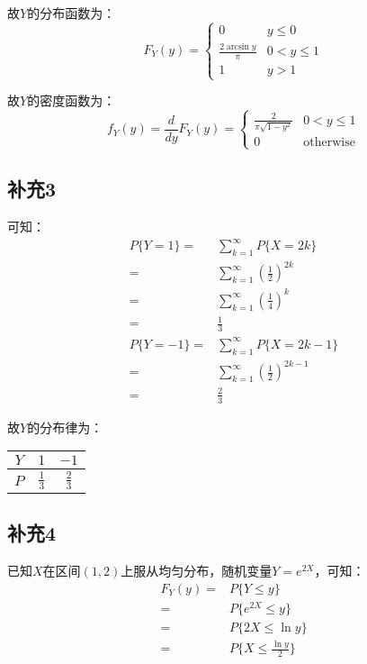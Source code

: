 \documentclass[a4paper,12pt]{ctexart}
\begin{document}
故$Y$的分布函数为：
\begin{equation*}
	F_Y(y) = 
	\begin{cases}
		0 & y \leq 0 \\
		\frac{2 \arcsin y}{\pi} & 0 < y \leq 1 \\
		1 & y > 1
	\end{cases}
\end{equation*}

故$Y$的密度函数为：
\begin{equation*}
	f_Y(y) = \frac{d}{dy}F_Y(y) =
	\begin{cases}
		\frac{2}{\pi \sqrt{1 - y^2}} & 0 < y \leq 1 \\
		0 & \text{otherwise}
	\end{cases}
\end{equation*}

\subsection*{补充3}

可知：
\begin{align*}
	P\{Y = 1\} =& \sum_{k = 1}^{\infty} P\{X = 2k\} \\
	=& \sum_{k = 1}^{\infty} (\frac{1}{2})^{2k} \\
	=& \sum_{k = 1}^{\infty} (\frac{1}{4})^{k} \\
	=& \frac{1}{3} \\
	P\{Y = -1\} =& \sum_{k = 1}^{\infty} P\{X = 2k - 1\} \\
	=& \sum_{k = 1}^{\infty} (\frac{1}{2})^{2k - 1} \\
	=& \frac{2}{3} 
\end{align*}

故$Y$的分布律为：
\begin{center}
	\begin{tabular}{c|cc}
		$Y$ & $1$ & $-1$ \\
		\hline
		$P$ & $\frac{1}{3}$ & $\frac{2}{3}$
	\end{tabular}
\end{center}

\subsection*{补充4}

已知$X$在区间$(1,2)$上服从均匀分布，随机变量$Y = e^{2X}$，可知：
\begin{align*}
	F_Y(y) =& P\{Y \leq y\} \\
	=& P\{e^{2X} \leq y\} \\
	=& P\{2X \leq \ln y\} \\
	=& P\{X \leq \frac{\ln y}{2}\} 
\end{align*}
\end{document}
